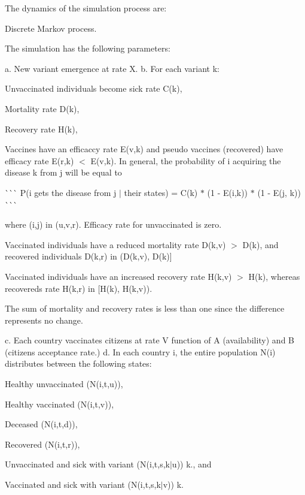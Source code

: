 The dynamics of the simulation process are\+:


\begin{DoxyEnumerate}
\item Discrete Markov process.
\item The simulation has the following parameters\+:

a. New variant emergence at rate {\ttfamily X.} b. For each variant {\ttfamily k}\+:
\begin{DoxyItemize}
\item Unvaccinated individuals become sick rate {\ttfamily C(k),}
\item Mortality rate {\ttfamily D(k),}
\item Recovery rate {\ttfamily H(k),}
\item Vaccines have an efficaccy rate {\ttfamily E(v,k)} and pseudo vaccines (recovered) have efficacy rate {\ttfamily E(r,k) $<$ E(v,k).} In general, the probability of {\ttfamily i} acquiring the disease {\ttfamily k} from {\ttfamily j} will be equal to
\end{DoxyItemize}

\`{}\`{}\`{} P(i gets the disease from j $\vert$ their states) = C(k) $\ast$ (1 -\/ E(i,k)) $\ast$ (1 -\/ E(j, k)) \`{}\`{}\`{}

where {\ttfamily (i,j) in (u,v,r).} Efficacy rate for unvaccinated is zero.
\begin{DoxyItemize}
\item Vaccinated individuals have a reduced mortality rate {\ttfamily D(k,v) $>$ D(k),} and recovered individuals {\ttfamily D(k,r) in (D(k,v), D(k)\mbox{]}}
\item Vaccinated individuals have an increased recovery rate {\ttfamily H(k,v) $>$ H(k)}, whereas recovered\textquotesingle{}s rate {\ttfamily H(k,r) in \mbox{[}H(k), H(k,v)).}
\end{DoxyItemize}

The sum of mortality and recovery rates is less than one since the difference represents no change.

c. Each country vaccinates citizens at rate {\ttfamily V} function of {\ttfamily A} (availability) and {\ttfamily B} (citizens\textquotesingle{} acceptance rate.) d. In each country {\ttfamily i,} the entire population {\ttfamily N(i)} distributes between the following states\+:
\begin{DoxyItemize}
\item Healthy unvaccinated ({\ttfamily N(i,t,u)}),
\item Healthy vaccinated ({\ttfamily N(i,t,v)}),
\item Deceased ({\ttfamily N(i,t,d)}),
\item Recovered ({\ttfamily N(i,t,r)}),
\item Unvaccinated and sick with variant ({\ttfamily N(i,t,s,k$\vert$u)}) {\ttfamily k.}, and
\item Vaccinated and sick with variant ({\ttfamily N(i,t,s,k$\vert$v)}) {\ttfamily k.}
\end{DoxyItemize}


\end{DoxyEnumerate}
